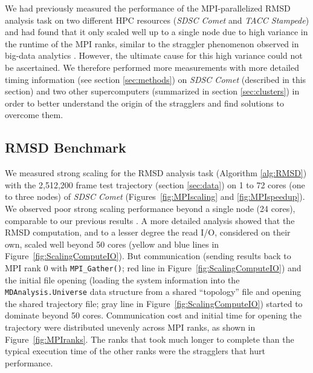 \label{sec:experiments}

We had previously measured the performance of the MPI-parallelized RMSD analysis task on two different HPC resources (\emph{SDSC Comet} and \emph{TACC Stampede}) and had found that it only scaled well up to a single node due to high variance in the runtime of the MPI ranks, similar to the straggler phenomenon observed in big-data analytics \cite{Khoshlessan:2017ab}.
However, the ultimate cause for this high variance could not be ascertained.
We therefore performed more measurements with more detailed timing information (see section \ref{sec:methods}) on \emph{SDSC Comet} (described in this section) and two other supercomputers (summarized in section \ref{sec:clusters}) in order to better understand the origin of the stragglers and find solutions to overcome them. 

\subsection{RMSD Benchmark}
\label{sec:RMSD}

We measured strong scaling for the RMSD analysis task (Algorithm \ref{alg:RMSD}) with the 2,512,200 frame test trajectory (section \ref{sec:data}) on 1 to 72 cores (one to three nodes) of \emph{SDSC Comet} (Figures~\ref{fig:MPIscaling} and \ref{fig:MPIspeedup}). 
We observed poor strong scaling performance beyond a single node (24 cores), comparable to our previous results \cite{Khoshlessan:2017ab}.
A more detailed analysis showed that the RMSD computation, and to a lesser degree the read I/O, considered on their own, scaled well beyond 50 cores (yellow and blue lines in Figure~\ref{fig:ScalingComputeIO}). 
But communication (sending results back to MPI rank 0 with \texttt{MPI\_Gather()}; red line in Figure~\ref{fig:ScalingComputeIO}) and the initial file opening (loading the system information into the \texttt{MDAnalysis.Universe} data structure from a shared ``topology'' file and opening the shared trajectory file; gray line in Figure~\ref{fig:ScalingComputeIO}) started to dominate beyond 50 cores.
Communication cost and initial time for opening the trajectory were distributed unevenly across MPI ranks, as shown in Figure~\ref{fig:MPIranks}. 
The ranks that took much longer to complete than the typical execution time of the other ranks were the stragglers that hurt performance.

